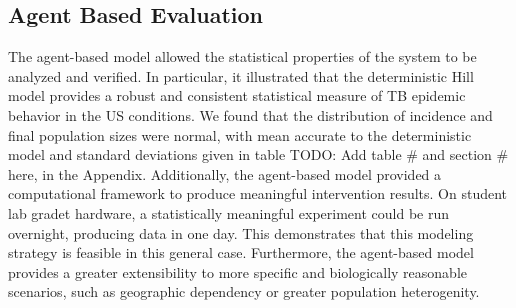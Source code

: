 \documentclass{amsart}
\begin{document}
\subsection{Agent Based Evaluation}
The agent-based model allowed the statistical properties of the system to be
analyzed and verified. In particular, it illustrated that the deterministic
Hill model provides a robust and consistent statistical measure of TB epidemic
behavior in the US conditions. We found that the distribution of incidence and
final population sizes were normal, with mean accurate to the deterministic
model and standard deviations given in table {\huge\color{red} TODO: Add table
\# and section \# here}, in the Appendix. Additionally,
the agent-based model provided a computational framework to produce
meaningful intervention results. On student lab gradet hardware, a statistically
meaningful experiment could be run overnight, producing data in one day. This
demonstrates that this modeling strategy is feasible in this general case.
Furthermore, the agent-based model provides a greater extensibility to more
specific and biologically reasonable scenarios, such as geographic dependency or
greater population heterogenity.  
\end{document}
